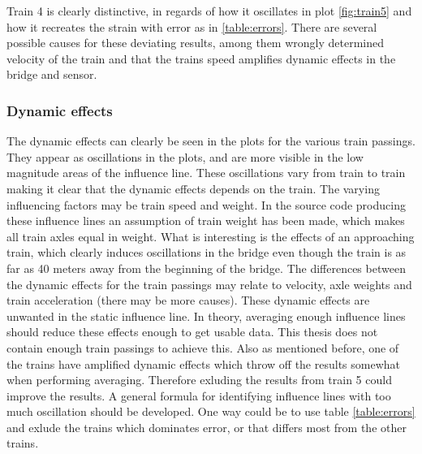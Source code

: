Train 4 is clearly distinctive, in regards of how it oscillates in plot \ref{fig:train5} and how it recreates the strain with error as in \ref{table:errors}. There are several possible causes for these deviating results, among them wrongly determined velocity of the train and that the trains speed amplifies dynamic effects in the bridge and sensor.
\subsubsection{Dynamic effects}
The dynamic effects can clearly be seen in the plots for the various train passings. They appear as oscillations in the plots, and are more visible in the low magnitude areas of the influence line. These oscillations vary from train to train making it clear that the dynamic effects depends on the train. The varying influencing factors may be train speed and weight. In the source code producing these influence lines an assumption of train weight has been made, which makes all train axles equal in weight.
What is interesting is the effects of an approaching train, which clearly induces oscillations in the bridge even though the train is as far as 40 meters away from the beginning of the bridge. The differences between the dynamic effects for the train passings may relate to velocity, axle weights and train acceleration (there may be more causes).
These dynamic effects are unwanted in the static influence line. In theory, averaging enough influence lines should reduce these effects enough to get usable data. This thesis does not contain enough train passings to achieve this. Also as mentioned before, one of the trains have amplified dynamic effects which throw off the results somewhat when performing averaging. Therefore exluding the results from train 5 could improve the results.
A general formula for identifying influence lines with too much oscillation should be developed. One way could be to use table \ref{table:errors} and exlude the trains which dominates error, or that differs most from the other trains.


